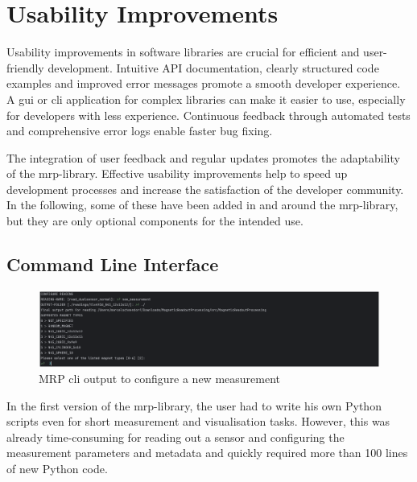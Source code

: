 \hypertarget{usability-improvements}{%
\chapter{Usability Improvements}\label{usability-improvements}}

Usability improvements in software libraries are crucial for efficient
and user-friendly development. Intuitive API documentation, clearly
structured code examples and improved error messages promote a smooth
developer experience. A \gls{gui} or \gls{cli} application for complex
libraries can make it easier to use, especially for developers with less
experience. Continuous feedback through automated tests and
comprehensive error logs enable faster bug fixing.

The integration of user feedback and regular updates promotes the
adaptability of the \gls{mrp}-library. Effective usability improvements
help to speed up development processes and increase the satisfaction of
the developer community. In the following, some of these have been added
in and around the \gls{mrp}-library, but they are only optional
components for the intended use.

\hypertarget{command-line-interface}{%
\section{Command Line Interface}\label{command-line-interface}}

\begin{figure}
\centering
\includegraphics{./generated_images/border_MRP_(+cli)_output_to_configure_a_new_measurement.png}
\caption{MRP \gls{cli} output to configure a new measurement
\label{MRP_(+cli)_output_to_configure_a_new_measurement.png}}
\end{figure}

In the first version of the \gls{mrp}-library, the user had to write his
own Python scripts even for short measurement and visualisation tasks.
However, this was already time-consuming for reading out a sensor and
configuring the measurement parameters and metadata and quickly required
more than 100 lines of new Python code.

